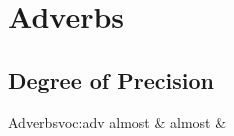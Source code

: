 ﻿%
\chapter{Adverbs}
\section{Degree of Precision}
\begin{tblvv}{Adverbs}{voc:adv}
  \tblx almost & 
  \tblc almost & 
\end{tblvv}


